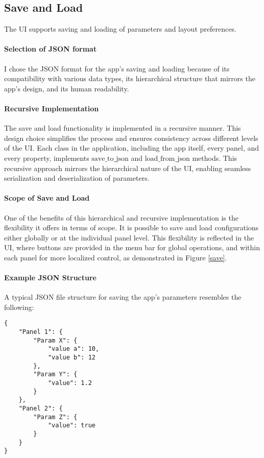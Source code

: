 \subsection{Save and Load}

The UI supports saving and loading of parameters and layout preferences.

\paragraph{Selection of JSON format}
I chose the JSON format for the app's saving and loading because of its compatibility with various data types, its hierarchical structure that mirrors the app's design, and its human readability.

\paragraph{Recursive Implementation}
The save and load functionality is implemented in a recursive manner. This design choice simplifies the process and ensures consistency across different levels of the UI. Each class in the application, including the app itself, every panel, and every property, implements $\text{save\_to\_json}$ and $\text{load\_from\_json}$ methods. This recursive approach mirrors the hierarchical nature of the UI, enabling seamless serialization and deserialization of parameters.

\paragraph{Scope of Save and Load}
One of the benefits of this hierarchical and recursive implementation is the flexibility it offers in terms of scope. It is possible to save and load configurations either globally or at the individual panel level. This flexibility is reflected in the UI, where buttons are provided in the menu bar for global operations, and within each panel for more localized control, as demonstrated in Figure \ref{save}.

\paragraph{Example JSON Structure}
A typical JSON file structure for saving the app's parameters resembles the following:

\begin{verbatim}
{
    "Panel 1": {
        "Param X": {
            "value a": 10,
            "value b": 12
        },
        "Param Y": {
            "value": 1.2
        }
    },
    "Panel 2": {
        "Param Z": {
            "value": true
        }
    }
}
\end{verbatim}


